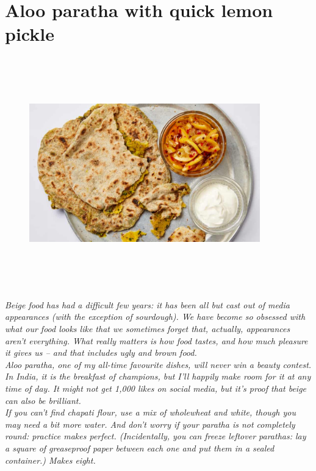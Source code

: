 \documentclass{book}
\begin{document}
\section{Aloo paratha with quick lemon pickle}
\begin{figure}
\centering\includegraphics[width=10cm,height=10cm,keepaspectratio]{Recipe_Pictures/Aloo_paratha_with_quick_lemon_pickle.png}
\end{figure}
\emph{Beige food has had a difficult few years: it has been all but cast out of media appearances (with the exception of sourdough). We have become so obsessed with what our food looks like that we sometimes forget that, actually, appearances aren’t everything. What really matters is how food tastes, and how much pleasure it gives us – and that includes ugly and brown food.\\ 
Aloo paratha, one of my all-time favourite dishes, will never win a beauty contest. In India, it is the breakfast of champions, but I’ll happily make room for it at any time of day. It might not get 1,000 likes on social media, but it’s proof that beige can also be brilliant.\\ 
If you can’t find chapati flour, use a mix of wholewheat and white, though you may need a bit more water. And don’t worry if your paratha is not completely round: practice makes perfect. (Incidentally, you can freeze leftover parathas: lay a square of greaseproof paper between each one and put them in a sealed container.) Makes eight.}\\\\ 
\end{document}
